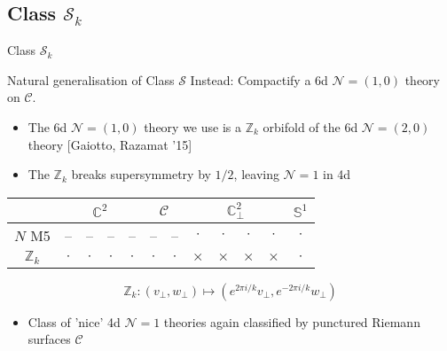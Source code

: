 \documentclass{beamer}
\begin{document}
\subsection{Class $\mathcal{S}_k$}
\begin{frame}{Class $\mathcal{S}_k$}
    \begin{block}{Natural generalisation of Class $\mathcal{S}$}
    Instead: Compactify a 6d $\mathcal{N}=(1,0)$ theory on $\mathcal{C}$. 
    \end{block}
    \begin{itemize}
      \itemsep1em
        \item {The 6d $\mathcal{N}=(1,0)$ theory we use is a $\mathbb{Z}_k$ orbifold of the 6d $\mathcal{N}=(2,0)$ theory \color{blue}[Gaiotto, Razamat '15]}
        \item{The $\mathbb{Z}_k$ breaks supersymmetry by $1/2$, leaving $\mathcal{N}=1$ in 4d}
    \end{itemize}
    \begin{center}
        \begin{tabular}{|c|c|c|c|c|c|c|c|c|c|c|c|}
               \multicolumn{1}{c|}{} &\multicolumn{4}{c|}{$\mathbb{C}^2$}&\multicolumn{2}{c|}{$\mathcal{C}$}&\multicolumn{4}{c|}{$\mathbb{C}^2_{\perp}$}&\multicolumn{1}{c|}{$\mathbb{S}^1$}\\\hline
             $N$ M5 & --&--&--&--&--&--&$\cdot$&$\cdot$&$\cdot$&$\cdot$&$\cdot$ \\\hline
             $\mathbb{Z}_k$ &$\cdot$&$\cdot$&$\cdot$&$\cdot$&$\cdot$&$\cdot$&$\times$&$\times$&$\times$&$\times$&$\cdot$ \\\hline
        \end{tabular}
    \end{center}
    \begin{equation*}
        \mathbb{Z}_k: (v_{\perp},w_{\perp})\mapsto (e^{2\pi i/k}v_{\perp},e^{-2\pi i/k}w_{\perp})
    \end{equation*}
        \begin{itemize}
        \item {Class of 'nice' 4d $\mathcal{N}=1$ theories again classified by punctured Riemann surfaces $\mathcal{C}$}
    \end{itemize}
\end{frame}
\end{document}
